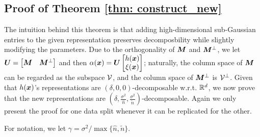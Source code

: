 \subsection{Proof of Theorem \ref{thm: construct_new}}

    The intuition behind this theorem is that adding high-dimensional sub-Gaussian entries to the given representation preserves decomposbility while slightly modifying the parameters. Due to the orthogonality of ${\bm{M}}$ and ${\bm{M}}^\perp$, we let ${\bm{U}} = \begin{bmatrix}
        {\bm{M}} \quad {\bm{M}}^\perp
    \end{bmatrix}$ and then $\alpha({\bm{x}}) = {\bm{U}}\begin{bmatrix}
        h({\bm{x}})\\
        \xi({\bm{x}})
    \end{bmatrix}$; naturally, the column space of ${\bm{M}}$ can be regarded as the subspace ${\mathcal{V}}$, and the column space of ${\bm{M}}^\perp$ is ${\mathcal{V}}^\perp$. Given that $h({\bm{x}})$'s representations are $(\delta, 0, 0)$-decomposable w.r.t. ${\mathbb{R}}^d$, we now prove that the new representations are $(\delta, \frac{\sigma^2}{\hat{n}}, \frac{\sigma^2}{\tilde{n}})$-decomposable. Again we only present the proof for one data split whenever it can be replicated for the other.  

    For notation, we let $\gamma = \sigma^2/\max\{\hat{n}, \tilde{n}\}$. 
    
